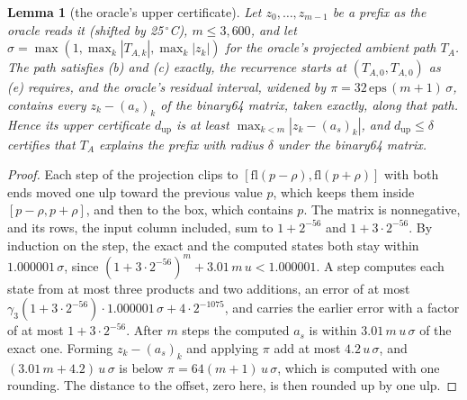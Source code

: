 \documentclass[11pt,a4paper]{article}
\newtheorem{alemma}{Lemma}[section]
\newcommand{\degC}{\ensuremath{{}^\circ}C}
\begin{document}
\begin{alemma}[the oracle's upper certificate]\label{lem:ocert}
Let $z_0,\dots,z_{m-1}$ be a prefix as the oracle reads it (shifted by 25\,\degC), $m\le3{,}600$, and let
$\sigma = \max(1, \max_k|T_{A,k}|, \max_k|z_k|)$ for the oracle's projected ambient path $T_A$. The path satisfies (b)
and (c) exactly, the recurrence starts at $(T_{A,0}, T_{A,0})$ as (e) requires, and the oracle's residual interval,
widened by $\pi = 32\,\mathrm{eps}\,(m+1)\,\sigma$, contains every $z_k - (a_s)_k$ of the binary64 matrix, taken
exactly, along that path. Hence its upper certificate $d_{\mathrm{up}}$ is at least $\max_{k<m}|z_k-(a_s)_k|$, and
$d_{\mathrm{up}}\le\delta$ certifies that $T_A$ explains the prefix with radius $\delta$ under the binary64 matrix.
\end{alemma}
\begin{proof}
Each step of the projection clips to $[\mathrm{fl}(p-\rho), \mathrm{fl}(p+\rho)]$ with both ends moved one ulp toward
the previous value $p$, which keeps them inside $[p-\rho, p+\rho]$, and then to the box, which contains $p$. The matrix
is nonnegative, and its rows, the input column included, sum to $1+2^{-56}$ and $1+3\cdot2^{-56}$. By induction on the
step, the exact and the computed states both stay within $1.000001\,\sigma$, since
$(1+3\cdot2^{-56})^m + 3.01\,m\,u < 1.000001$. A step computes each state from at most three products and two
additions, an error of at most $\gamma_3(1+3\cdot2^{-56})\cdot1.000001\,\sigma + 4\cdot2^{-1075}$, and carries the
earlier error with a factor of at most $1+3\cdot2^{-56}$. After $m$ steps the computed $a_s$ is within
$3.01\,m\,u\,\sigma$ of the exact one. Forming $z_k - (a_s)_k$ and applying $\pi$ add at most $4.2\,u\,\sigma$, and
$(3.01\,m + 4.2)\,u\,\sigma$ is below $\pi = 64(m+1)\,u\,\sigma$, which is computed with one rounding. The distance to
the offset, zero here, is then rounded up by one ulp.
\end{proof}
\end{document}
